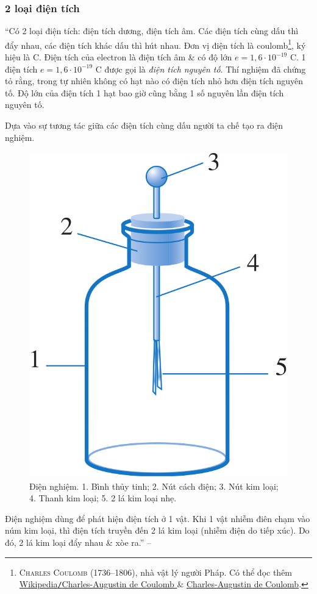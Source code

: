 \documentclass[oneside]{book}
\numberwithin{equation}{section}
\begin{document}
\subsubsection{2 loại điện tích}
``Có 2 loại điện tích: điện tích dương, điện tích âm. Các điện tích cùng dấu thì đẩy nhau, các điện tích khác dấu thì hút nhau. Đơn vị điện tích là coulomb\footnote{\textsc{Charles Coulomb} (1736--1806), nhà vật lý người Pháp. Có thể đọc thêm \href{https://vi.wikipedia.org/wiki/Charles-Augustin_de_Coulomb}{Wikipedia\texttt{/}Charles-Augustin de Coulomb
} \& \href{https://en.wikipedia.org/wiki/Charles-Augustin_de_Coulomb}{Charles-Augustin de Coulomb}.}, ký hiệu là C. Điện tích của electron là điện tích âm \& có độ lớn $e = 1,6\cdot 10^{-19}$ C. 1 điện tích $e = 1,6\cdot 10^{-19}$ C được gọi là \textit{điện tích nguyên tố}. Thí nghiệm đã chứng tỏ rằng, trong tự nhiên không có hạt nào có điện tích nhỏ hơn điện tích nguyên tố. Độ lớn của điện tích 1 hạt bao giờ cũng bằng 1 số nguyên lần điện tích nguyên tố.

Dựa vào sự tương tác giữa các điện tích cùng dấu người ta chế tạo ra điện nghiệm.

\begin{figure}[H]
	\centering
	\includegraphics[scale=0.15]{dien_nghiem}
	\caption{Điện nghiệm. 1. Bình thủy tinh; 2. Nút cách điện; 3. Nút kim loại; 4. Thanh kim loại; 5. 2 lá kim loại nhẹ.}
\end{figure}
Điện nghiệm dùng để phát hiện điện tích ở 1 vật. Khi 1 vật nhiễm điên chạm vào núm kim loại, thì điện tích truyền đến 2 lá kim loại (nhiễm điện do tiếp xúc). Do đó, 2 lá kim loại đẩy nhau \& xòe ra.'' -- \cite[p. 6]{SGK_Vat_Ly_11_nang_cao}
\end{document}
